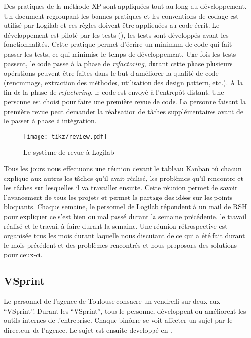 Des pratiques de la méthode XP sont appliquées tout au long du développement.
Un document regroupant les bonnes pratiques et les conventions de codage est
utilisé par Logilab et ces règles doivent être appliquées au code écrit. Le
développement est piloté par les tests (), les tests sont
développés avant les fonctionnalités. Cette pratique permet d'écrire un minimum
de code qui fait passer les tests, ce qui minimise le temps de développement.
Une fois les tests passent, le code passe à la phase de \textit{refactoring},
durant cette phase plusieurs opérations peuvent être faites dans le but
d'améliorer la qualité de code (renommage, extraction des méthodes, utilisation
des design pattern, etc.). \`A la fin de la phase de \textit{refactoring}, le
code est envoyé à l’entrepôt distant. Une personne est choisi pour faire une
première revue de code. La personne faisant la première revue peut demander la
réalisation de tâches supplémentaires avant de le passer à phase d'intégration. 

\begin{figure} 
    \centering 
    \texttt{[image: tikz/review.pdf]}
    \caption{Le système de revue à Logilab} 
    \label{fig:review} 
\end{figure}

Tous les jours nous effectuons une réunion devant le tableau Kanban où chacun
explique aux autres les tâches qu'il avait réalisé, les problèmes qu'il
rencontre et les tâches sur lesquelles il va travailler ensuite. Cette réunion
permet de savoir l'avancement de tous les projets et permet le partage des
idées sur les points bloquants. Chaque semaine, le personnel de Logilab
répondent à un mail de RSH pour expliquer ce s'est bien ou mal passé durant la
semaine précédente, le travail réalisé et le travail à faire durant la semaine.
Une réunion rétrospective est organisée tous les mois durant laquelle nous
discutant de ce qui a été fait durant le mois précédent et des problèmes
rencontrés et nous proposons des solutions pour ceux-ci. 

\subsection{VSprint} 
Le personnel de l'agence de Toulouse consacre un vendredi sur deux
aux ``VSprint''. Durant les ``VSprint'', tous le personnel développent 
ou améliorent les outils internes de l'entreprise. Chaque binôme se voit affecter 
un sujet par le directeur de l'agence. Le sujet est ensuite développé en 
.

